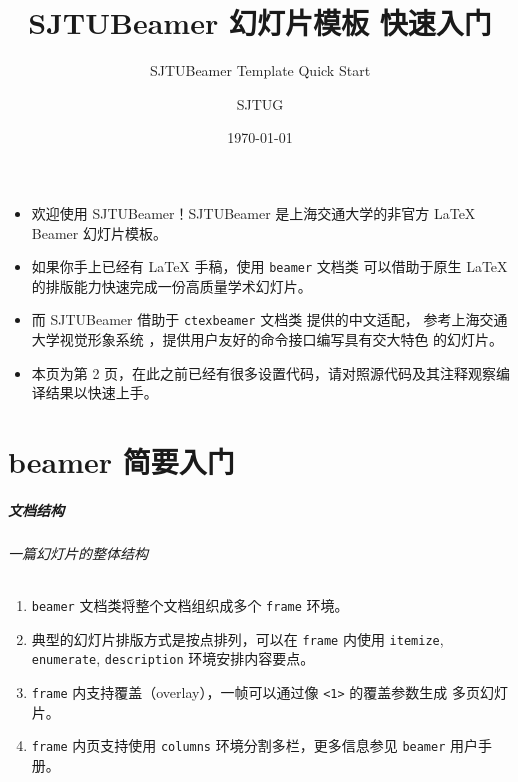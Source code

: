 \documentclass[
    aspectratio=169,  %
]{ctexbeamer}
\title{SJTUBeamer 幻灯片模板 快速入门}
\subtitle{SJTUBeamer Template Quick Start}
\author{SJTUG}
\institute[Linux User Group]{Linux 用户组}
\date{\today}
\begin{document}
\maketitle

\begin{frame}
  \begin{itemize}
    \item 欢迎使用 SJTUBeamer！SJTUBeamer 是上海交通大学的非官方 \LaTeX{} Beamer 幻灯片模板。

    \item 如果你手上已经有 \LaTeX{} 手稿，使用 \texttt{beamer} 文档类 
          可以借助于原生 \LaTeX{} 的排版能力快速完成一份高质量学术幻灯片。

    \item 而 SJTUBeamer 借助于 \texttt{ctexbeamer} 文档类  提供的中文适配，
          参考上海交通大学视觉形象系统 ，提供用户友好的命令接口编写具有交大特色
          的幻灯片。

    \item 本页为第 2 页，在此之前已经有很多设置代码，请对照源代码及其注释观察编译结果以快速上手。
  \end{itemize}
\end{frame}

\part{beamer 简要入门}

\begin{frame}
  \frametitle{文档结构}
  \framesubtitle{一篇幻灯片的整体结构}

  \begin{enumerate}
    \item \texttt{beamer} 文档类将整个文档组织成多个 \texttt{frame} 环境。
    \item 典型的幻灯片排版方式是按点排列，可以在 \texttt{frame} 内使用 \texttt{itemize},
          \texttt{enumerate}, \texttt{description} 环境安排内容要点。
    \item \texttt{frame} 内支持覆盖（overlay），一帧可以通过像 \texttt{<1>} 的覆盖参数生成
          多页幻灯片。
    \item \texttt{frame} 内页支持使用 \texttt{columns} 环境分割多栏，更多信息参见
          \texttt{beamer} 用户手册\cite{beamerman}。
  \end{enumerate}

\end{frame}
\end{document}
